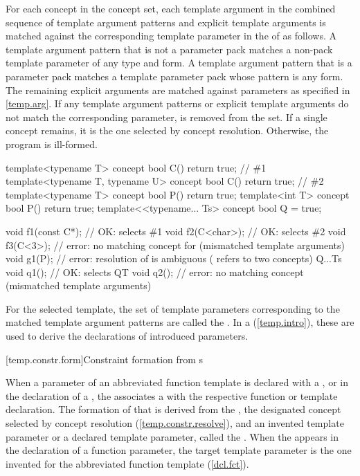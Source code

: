 \pnum
For each concept  in the concept set, each template 
argument in the combined sequence of template argument patterns and explicit 
template arguments is matched against the corresponding template parameter
in the  of 
 as follows.
% 
A template argument pattern that is not a parameter pack matches a 
non-pack template parameter of any type and form. A template argument 
pattern that is a parameter pack matches a template parameter pack
whose pattern is any form.
% 
The remaining explicit arguments are matched against parameters
as specified in \ref{temp.arg}.
% 
If any template argument patterns or explicit template arguments do not 
match the corresponding parameter,  is removed from the set.
% 
If a single concept remains, it is the one selected by concept 
resolution. Otherwise, the program is ill-formed. 
% 
\enterexample
\begin{codeblock}
template<typename T> concept bool C() { return true; }             // \#1
template<typename T, typename U> concept bool C() { return true; } // \#2
template<typename T> concept bool P() { return true; }
template<int T> concept bool P() { return true; }
template<<typename... Ts> concept bool Q = true;

void f1(const C*);  // OK:  selects \#1
void f2(C<char>);   // OK:  selects \#2
void f3(C<3>);      // error: no matching concept for  (mismatched template arguments)
void g1(P);         // error: resolution of  is ambiguous ( refers to two concepts)
Q{...Ts} void q1(); // OK: selects 
Q{T} void q2();     // error: no matching concept (mismatched template arguments)
\end{codeblock}
\exitexample

\pnum
For the selected template, the set of template parameters corresponding
to the matched template argument patterns are called the
. 
% 
In a  (\ref{temp.intro}), these
are used to derive the declarations of introduced parameters.


[temp.constr.form]{Constraint formation from s}

\pnum
When a parameter of an abbreviated function template is declared
with a ,
or in the declaration of a 
,
the 
associates a 
with the respective function or template declaration.
% 
The formation of that 
is derived from the ,
the designated concept selected by concept resolution 
(\ref{temp.constr.resolve}), and an 
invented template parameter or a declared template parameter, called
the .
% 
When the 
appears in the declaration of a function parameter, the target template
parameter is the one invented for the abbreviated function template
(\ref{dcl.fct}).

